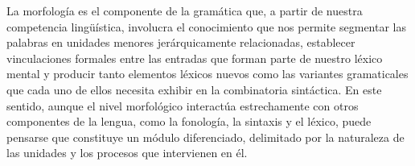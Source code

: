 \begin{recuadro}
La morfología es el componente de la gramática que, a partir de nuestra
competencia lingüística, involucra el conocimiento que nos permite segmentar las
palabras en unidades menores jerárquicamente relacionadas, establecer
vinculaciones formales entre las entradas que forman parte de nuestro léxico
mental y producir tanto elementos léxicos nuevos como las variantes gramaticales
que cada uno de ellos necesita exhibir en la combinatoria sintáctica. En este
sentido, aunque el nivel morfológico interactúa estrechamente con otros
componentes de la lengua, como la fonología, la sintaxis y el léxico, puede
pensarse que constituye un módulo diferenciado, delimitado por la naturaleza de
las unidades y los procesos que intervienen en él.
\end{recuadro}

\lecturasrecomendadas

\solucionario

